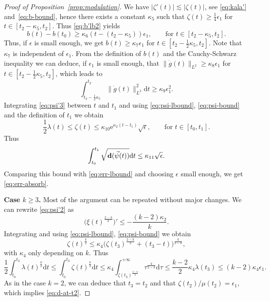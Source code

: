 \documentclass[10pt,reqno]{amsart}
\newcommand{\eee}{\mathrm e}
\newcommand{\la}{\lambda}
\numberwithin{equation}{section}
\theoremstyle{remark}
\newcommand{\ud}{\mathrm{d}}
\newcommand{\0}{\emptyset}
\newcommand{\eps}{\epsilon}
\newcommand{\bfd}{{\bf d}}
\begin{document}
\begin{proof}[Proof of Proposition~\ref{prop:modulation}]
We have $|\zeta'(t)| \lesssim |\zeta(t)|$, see \eqref{eq:kala'} and~\eqref{eq:b-bound},
hence there exists a constant $\kappa_5$
such that $\zeta(t) \geq \frac 14 \eps_1$ for $t \in [t_2 - \kappa_5, t_2]$.
Thus \eqref{eq:b'lb2} yields
\begin{equation}
b(t) - b(t_0) \geq \kappa_6 (t - (t_2 - \kappa_5)) \eps_1, \qquad \text{for }t \in [t_2 - \kappa_5, t_2].
\end{equation}
Thus, if $\eps$ is small enough, we get
$b(t) \geq \kappa_7 \eps_1$ for $t \in [t_2 - \frac 12 \kappa_5, t_2]$.
Note that $\kappa_7$ is independent of $\eps_1$.
From the definition of $b(t)$ and the Cauchy-Schwarz inequality we can deduce, if $\eps_1$ is small enough,
that $\|\dot g(t)\|_{L^2} \geq \kappa_8 \eps_1$ for $t \in [t_2 - \frac 12 \kappa_5, t_2]$, which leads to
\begin{equation}
\label{eq:err-lbound}
\int_{t_2 - \frac 12 \kappa_5}^{t_2} \|\dot g(t)\|_{L^2}^2 \ud t \geq \kappa_9 \eps_1^2.
\end{equation}
Integrating \eqref{eq:psi'3} between $t$ and $t_1$ and using \eqref{eq:psi-lbound}, \eqref{eq:psi-bound}
and the definition of $t_1$ we obtain
\begin{equation}
\frac{1}{2} \la(t) \le \zeta(t) \leq \kappa_{10} \eee^{\kappa_2(t-t_1)}\sqrt{\eps}, \qquad \text{for }t \in [t_0, t_1].
\end{equation}
Thus
\begin{equation}
\label{eq:err-bound}
\int_{t_0}^{t_1}\sqrt{\bfd(\vec \psi(t))}\ud t \leq \kappa_{11}\sqrt{\eps}.
\end{equation}
Comparing this bound with \eqref{eq:err-lbound} and choosing $\eps$ small enough,
we get \eqref{eq:err-absorb}.


\textbf{Case $k \geq 3$.}
Most of the argument can be repeated without major changes. We can rewrite \eqref{eq:psi'2} as
\begin{equation}
\label{eq:psi'3k}
\big(\xi(t)^{\frac{2-k}{k}}\big)' \leq -\frac{(k-2)\kappa_2}{k}.
\end{equation}
Integrating and using \eqref{eq:psi-lbound}, \eqref{eq:psi-bound} we obtain
\begin{equation}
\label{eq:lambda-bound-k}
\zeta(t)^\frac k2 \leq \kappa_4 \big(\zeta(t_3)^\frac{2-k}{2} + (t_3 - t)\big)^\frac{k}{2-k},
\end{equation}
with $\kappa_4$ only depending on $k$. Thus
\begin{equation}
\frac{1}{2}\int_{t_0}^{t_3}\lambda(t)^\frac k2 \ud t  \le\int_{t_0}^{t_3}\zeta(t)^\frac k2 \ud t \leq \kappa_4 \int_{\zeta(t_3)^{\frac{2-k}{2}}}^{+\infty}
\tau^\frac{k}{2-k}\ud \tau \leq \frac{k-2}{2}\kappa_4 \lambda(t_3) \leq (k-2)\kappa_4 \eps_1.
\end{equation}
As in the case $k = 2$, we can deduce that $t_3 = t_2$ and that $\zeta(t_2)/\mu(t_2) = \eps_1$,
which implies \eqref{eq:d-at-t2}.


\end{proof}
\end{document}
